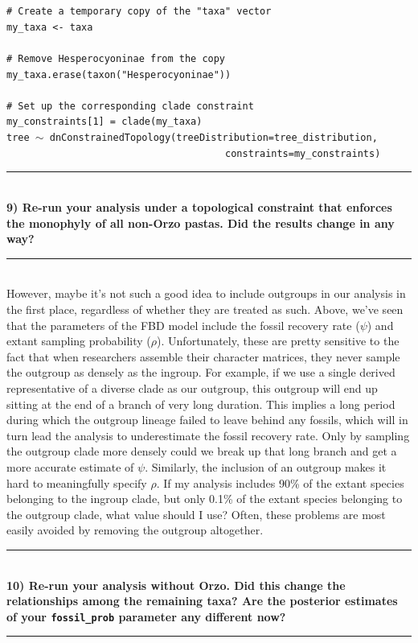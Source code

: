 \documentclass[12pt]{article}
\begin{document}
\indent \texttt{\# Create a temporary copy of the "taxa" vector} \\
\indent \texttt{my\_taxa <- taxa} \\
\ \\
\indent \texttt{\# Remove Hesperocyoninae from the copy} \\
\indent \texttt{my\_taxa.erase(taxon("Hesperocyoninae"))} \\
\ \\
\indent \texttt{\# Set up the corresponding clade constraint} \\
\indent \texttt{my\_constraints[1] = clade(my\_taxa)} \\
\indent \texttt{tree {\footnotesize $\sim$} dnConstrainedTopology(treeDistribution=tree\_distribution,} \\
\indent \texttt{\ \ \ \,\ \ \ \ \ \ \ \ \ \ \ \ \ \ \ \ \ \ \ \ \ \ \ \ \ \ \ \ \ \ \ \,\,\ constraints=my\_constraints)} \\

\hrule
\ \\[1ex]
\textbf{9) Re-run your analysis under a topological constraint that enforces the monophyly of all non-Orzo pastas. Did the results change in any way?} \\
\hrule
\ \\[1ex]
\noindent However, maybe it's not such a good idea to include outgroups in our analysis in the first place, regardless of whether they are treated as such. Above, we've seen that the parameters of the FBD model include the fossil recovery rate ($\psi$) and extant sampling probability ($\rho$). Unfortunately, these are pretty sensitive to the fact that when researchers assemble their character matrices, they never sample the outgroup as densely as the ingroup. For example, if we use a single derived representative of a diverse clade as our outgroup, this outgroup will end up sitting at the end of a branch of very long duration. This implies a long period during which the outgroup lineage failed to leave behind any fossils, which will in turn lead the analysis to underestimate the fossil recovery rate. Only by sampling the outgroup clade more densely could we break up that long branch and get a more accurate estimate of $\psi$. Similarly, the inclusion of an outgroup makes it hard to meaningfully specify $\rho$. If my analysis includes 90\% of the extant species belonging to the ingroup clade, but only 0.1\% of the extant species belonging to the outgroup clade, what value should I use? Often, these problems are most easily avoided by removing the outgroup altogether. \\

\hrule
\ \\[1ex]
\textbf{10) Re-run your analysis without Orzo. Did this change the relationships among the remaining taxa? Are the posterior estimates of your \texttt{fossil\_prob} parameter any different now?} \\
\hrule
\end{document}
